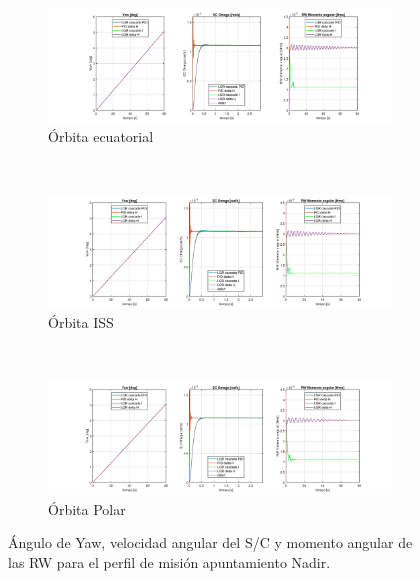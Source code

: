 \begin{figure}
	\centering
	\begin{subfigure}{1.2\linewidth}
		\includegraphics[width=\linewidth]{imagenes/resultados/Nadir/orbit_zero/Compilado2.PNG}
		\caption{Órbita ecuatorial}
		\label{fig:nadir_zero}
	\end{subfigure}\\
	\begin{subfigure}{1.2\linewidth}
		\includegraphics[width=\linewidth]{imagenes/resultados/Nadir/orbit_iss/Compilado2.PNG}
		\caption{Órbita ISS}
		\label{fig:nadir_iss}
	\end{subfigure}\\
	\begin{subfigure}{1.2\linewidth}
		\includegraphics[width=\linewidth]{imagenes/resultados/Nadir/orbit_polar/Compilado2.PNG}
		\caption{Órbita Polar}
		\label{fig:nadir_polar}
	\end{subfigure}
	\caption{Ángulo de Yaw, velocidad angular del S/C y momento angular de las RW para el perfil de misión apuntamiento Nadir.}
	\label{fig:nadir}
\end{figure}  
\clearpage


